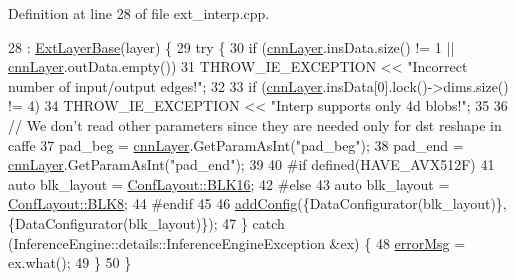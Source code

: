 Definition at line 28 of file ext\+\_\+interp.\+cpp.


\begin{DoxyCode}
28                                               : \hyperlink{classInferenceEngine_1_1Extensions_1_1Cpu_1_1ExtLayerBase_affff0e8263ca26852ccf71d299d7b06a}{ExtLayerBase}(layer) \{
29         \textcolor{keywordflow}{try} \{
30             \textcolor{keywordflow}{if} (\hyperlink{classInferenceEngine_1_1Extensions_1_1Cpu_1_1ExtLayerBase_a1074cdccacb9e9ca6eec01bbc2f7ca4a}{cnnLayer}.insData.size() != 1 || \hyperlink{classInferenceEngine_1_1Extensions_1_1Cpu_1_1ExtLayerBase_a1074cdccacb9e9ca6eec01bbc2f7ca4a}{cnnLayer}.outData.empty())
31                 THROW\_IE\_EXCEPTION << \textcolor{stringliteral}{"Incorrect number of input/output edges!"};
32 
33             \textcolor{keywordflow}{if} (\hyperlink{classInferenceEngine_1_1Extensions_1_1Cpu_1_1ExtLayerBase_a1074cdccacb9e9ca6eec01bbc2f7ca4a}{cnnLayer}.insData[0].lock()->dims.size() != 4)
34                 THROW\_IE\_EXCEPTION << \textcolor{stringliteral}{"Interp supports only 4d blobs!"};
35 
36             \textcolor{comment}{// We don't read other parameters since they are needed only for dst reshape in caffe}
37             pad\_beg = \hyperlink{classInferenceEngine_1_1Extensions_1_1Cpu_1_1ExtLayerBase_a1074cdccacb9e9ca6eec01bbc2f7ca4a}{cnnLayer}.GetParamAsInt(\textcolor{stringliteral}{"pad\_beg"});
38             pad\_end = \hyperlink{classInferenceEngine_1_1Extensions_1_1Cpu_1_1ExtLayerBase_a1074cdccacb9e9ca6eec01bbc2f7ca4a}{cnnLayer}.GetParamAsInt(\textcolor{stringliteral}{"pad\_end"});
39 
40 \textcolor{preprocessor}{#if defined(HAVE\_AVX512F)}
41             \textcolor{keyword}{auto} blk\_layout = \hyperlink{classInferenceEngine_1_1Extensions_1_1Cpu_1_1ExtLayerBase_a1258a8d209e0249e0b1717618352ddfba733623e98c6602d47f51e9f7be2f7d6c}{ConfLayout::BLK16};
42 \textcolor{preprocessor}{#else}
43             \textcolor{keyword}{auto} blk\_layout = \hyperlink{classInferenceEngine_1_1Extensions_1_1Cpu_1_1ExtLayerBase_a1258a8d209e0249e0b1717618352ddfba6023b7e0a175b8cf9cbcec3ac3cbf93d}{ConfLayout::BLK8};
44 \textcolor{preprocessor}{#endif}
45 
46             \hyperlink{classInferenceEngine_1_1Extensions_1_1Cpu_1_1ExtLayerBase_a0ac7a6632e95b9500d5246b05b4b0bfa}{addConfig}(\{DataConfigurator(blk\_layout)\}, \{DataConfigurator(blk\_layout)\});
47         \} \textcolor{keywordflow}{catch} (InferenceEngine::details::InferenceEngineException &ex) \{
48             \hyperlink{classInferenceEngine_1_1Extensions_1_1Cpu_1_1ExtLayerBase_abc78e9b5a79fa339ffd831a5318f71f7}{errorMsg} = ex.what();
49         \}
50     \}
\end{DoxyCode}


